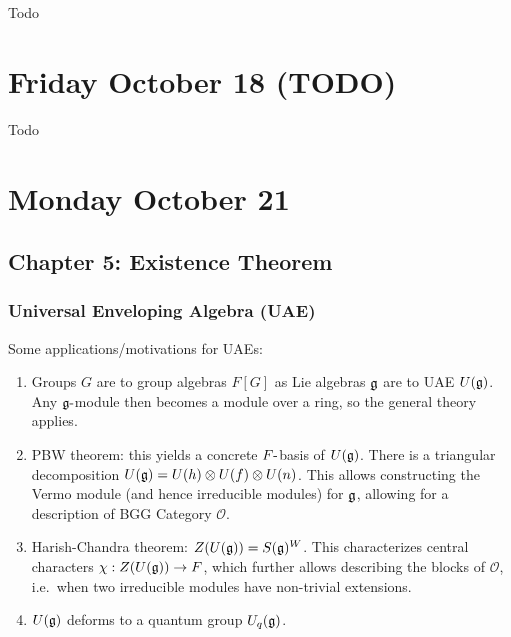 Todo

\hypertarget{friday-october-18-todo}{%
\section{Friday October 18 (TODO)}\label{friday-october-18-todo}}

Todo

\hypertarget{monday-october-21}{%
\section{Monday October 21}\label{monday-october-21}}

\hypertarget{chapter-5-existence-theorem}{%
\subsection{Chapter 5: Existence
Theorem}\label{chapter-5-existence-theorem}}

\hypertarget{universal-enveloping-algebra-uae}{%
\subsubsection{Universal Enveloping Algebra
(UAE)}\label{universal-enveloping-algebra-uae}}

Some applications/motivations for UAEs:

\begin{enumerate}
\def\labelenumi{\arabic{enumi}.}
\tightlist
\item
  Groups \(G\) are to group algebras \(F[G]\) as Lie algebras \({\mathfrak{g}}\)
  are to UAE \(U({\mathfrak{g}})\). Any \({\mathfrak{g}}{\hbox{-}}\)module then becomes a
  module over a ring, so the general theory applies.
\item
  PBW theorem: this yields a concrete \(F{\hbox{-}}\)basis of \(U({\mathfrak{g}})\).
  There is a triangular decomposition
  \(U({\mathfrak{g}}) = U(h) \otimes U(f) \otimes U(n)\). This allows
  constructing the Vermo module (and hence irreducible modules) for
  \({\mathfrak{g}}\), allowing for a description of BGG Category \(\mathcal O\).
\item
  Harish-Chandra theorem: \(Z(U({\mathfrak{g}})) = S({\mathfrak{g}})^W\). This
  characterizes central characters \(\chi: Z(U({\mathfrak{g}})) \to F\), which
  further allows describing the blocks of \(\mathcal O\), i.e.~when two
  irreducible modules have non-trivial extensions.
\item
  \(U({\mathfrak{g}})\) deforms to a quantum group \(U_q({\mathfrak{g}})\).
\end{enumerate}

